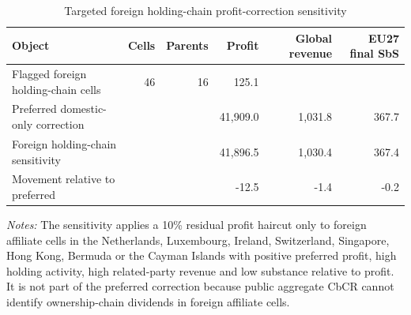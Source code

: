 \begin{table}[H]
\centering
\footnotesize
\setlength{\tabcolsep}{3pt}
\caption{Targeted foreign holding-chain profit-correction sensitivity}
\label{tab:profit_correction_foreign_holding_chain}
\begin{tabular}{@{}lrrrrr@{}}
\toprule
Object & Cells & Parents & Profit & Global revenue & EU27 final SbS \\
\midrule
Flagged foreign holding-chain cells & 46 & 16 & 125.1 &  &  \\
Preferred domestic-only correction &  &  & 41,909.0 & 1,031.8 & 367.7 \\
Foreign holding-chain sensitivity &  &  & 41,896.5 & 1,030.4 & 367.4 \\
Movement relative to preferred &  &  & -12.5 & -1.4 & -0.2 \\
\bottomrule
\end{tabular}

\vspace{0.35em}
\noindent\begin{minipage}{\textwidth}
\footnotesize\raggedright\textit{Notes:} The sensitivity applies a 10\% residual profit haircut only to foreign affiliate cells in the Netherlands, Luxembourg, Ireland, Switzerland, Singapore, Hong Kong, Bermuda or the Cayman Islands with positive preferred profit, high holding activity, high related-party revenue and low substance relative to profit. It is not part of the preferred correction because public aggregate CbCR cannot identify ownership-chain dividends in foreign affiliate cells.
\end{minipage}
\end{table}
